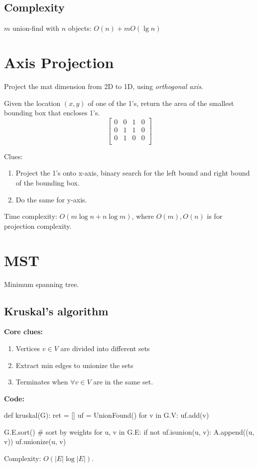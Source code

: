 \subsection{Complexity}
$m$ union-find with $n$ objects: $O(n)+m O(\lg n)$


\section{Axis Projection}
Project the mat dimension from 2D to 1D, using \textit{orthogonal axis}.

 Given the location $(x, y)$ of one of the 1's, return the area of the smallest bounding box that encloses 1's.
$$
\begin{bmatrix}
0& 0& 1& 0 \\
0& 1& 1& 0 \\
0& 1& 0& 0 \\
\end{bmatrix}
$$

Clues:
\begin{enumerate}
\item Project the 1's onto x-axis, binary search for the left bound and right bound of the bounding box.
\item Do the same for y-axis.
\end{enumerate}

Time complexity: $O(m\log n + n \log m)$, where $O(m), O(n)$ is for projection complexity.
\section{MST}
Minimum spanning tree.
\subsection{Kruskal's algorithm}
\textbf{Core clues:}
\begin{enumerate}
\item Vertices $v \in V$ are divided into different sets
\item Extract min edges to unionize the sets
\item Terminates when $\forall v\in V$ are in the same set.
\end{enumerate}
\textbf{Code:}
\begin{python}[mathescape]
def kruskal(G):
  ret = []
  uf = UnionFound()
  for v in G.V:
    uf.add(v)

  G.E.sort()  # sort by weights
  for u, v in G.E:
    if not uf.isunion(u, v):
      A.append((u, v))
      uf.unionize(u, v)
\end{python}
Complexity: $O(|E|\log |E|)$.

